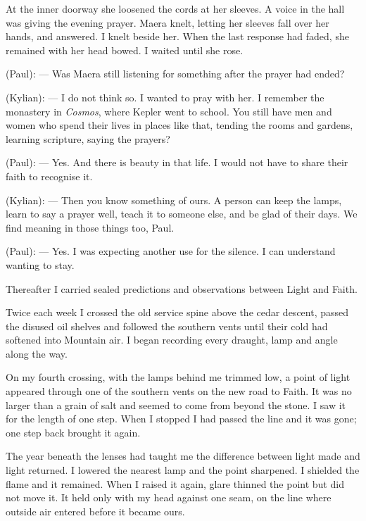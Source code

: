 At the inner doorway she loosened the cords at her sleeves. A voice in the hall was giving the evening prayer. Maera knelt, letting her sleeves fall over her hands, and answered. I knelt beside her. When the last response had faded, she remained with her head bowed. I waited until she rose.\par

\begin{room}

(Paul): --- Was Maera still listening for something after the prayer had ended?

(Kylian): --- I do not think so. I wanted to pray with her. I remember the monastery in \textit{Cosmos}, where Kepler went to school. You still have men and women who spend their lives in places like that, tending the rooms and gardens, learning scripture, saying the prayers?

(Paul): --- Yes. And there is beauty in that life. I would not have to share their faith to recognise it.

(Kylian): --- Then you know something of ours. A person can keep the lamps, learn to say a prayer well, teach it to someone else, and be glad of their days. We find meaning in those things too, Paul.

(Paul): --- Yes. I was expecting another use for the silence. I can understand wanting to stay.

\end{room}

Thereafter I carried sealed predictions and observations between Light and Faith.\par

\ornament

Twice each week I crossed the old service spine above the cedar descent, passed the disused oil shelves and followed the southern vents until their cold had softened into Mountain air. I began recording every draught, lamp and angle along the way.\par

On my fourth crossing, with the lamps behind me trimmed low, a point of light appeared through one of the southern vents on the new road to Faith. It was no larger than a grain of salt and seemed to come from beyond the stone. I saw it for the length of one step. When I stopped I had passed the line and it was gone; one step back brought it again.\par

The year beneath the lenses had taught me the difference between light made and light returned. I lowered the nearest lamp and the point sharpened. I shielded the flame and it remained. When I raised it again, glare thinned the point but did not move it. It held only with my head against one seam, on the line where outside air entered before it became ours.\par


